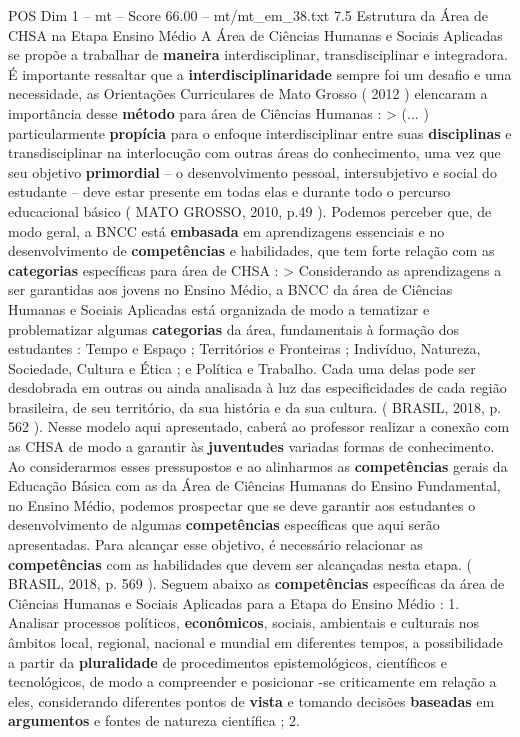 \begin{textsample}{POS Dim 1 – mt – Score 66.00 – mt/mt\_em\_38.txt}  \label{ex:f1_pos_075}
7.5 Estrutura da Área de CHSA na Etapa Ensino Médio A Área de Ciências Humanas e Sociais Aplicadas se propõe a trabalhar de \textbf{maneira} interdisciplinar, transdisciplinar e integradora.
É importante ressaltar que a \textbf{interdisciplinaridade} sempre foi um desafio e uma necessidade, as Orientações Curriculares de Mato Grosso ( 2012 ) elencaram a importância desse \textbf{método} para área de Ciências Humanas : > (... ) particularmente \textbf{propícia} para o enfoque interdisciplinar entre suas \textbf{disciplinas} e transdisciplinar na interlocução com outras áreas do conhecimento, uma vez que seu objetivo \textbf{primordial} – o desenvolvimento pessoal, intersubjetivo e social do estudante – deve estar presente em todas elas e durante todo o percurso educacional básico ( MATO GROSSO, 2010, p.49 ).
Podemos perceber que, de modo geral, a BNCC está \textbf{embasada} em aprendizagens essenciais e no desenvolvimento de \textbf{competências} e habilidades, que tem forte relação com as \textbf{categorias} específicas para área de CHSA : > Considerando as aprendizagens a ser garantidas aos jovens no Ensino Médio, a BNCC da área de Ciências Humanas e Sociais Aplicadas está organizada de modo a tematizar e problematizar algumas \textbf{categorias} da área, fundamentais à formação dos estudantes : Tempo e Espaço ; Territórios e Fronteiras ; Indivíduo, Natureza, Sociedade, Cultura e Ética ; e Política e Trabalho.
Cada uma delas pode ser desdobrada em outras ou ainda analisada à luz das especificidades de cada região brasileira, de seu território, da sua história e da sua cultura. ( BRASIL, 2018, p. 562 ).
Nesse modelo aqui apresentado, caberá ao professor realizar a conexão com as CHSA de modo a garantir às \textbf{juventudes} variadas formas de conhecimento.
Ao considerarmos esses pressupostos e ao alinharmos as \textbf{competências} gerais da Educação Básica com as da Área de Ciências Humanas do Ensino Fundamental, no Ensino Médio, podemos prospectar que se deve garantir aos estudantes o desenvolvimento de algumas \textbf{competências} específicas que aqui serão apresentadas.
Para alcançar esse objetivo, é necessário relacionar as \textbf{competências} com as habilidades que devem ser alcançadas nesta etapa. ( BRASIL, 2018, p. 569 ).
Seguem abaixo as \textbf{competências} específicas da área de Ciências Humanas e Sociais Aplicadas para a Etapa do Ensino Médio : 1.
Analisar processos políticos, \textbf{econômicos}, sociais, ambientais e culturais nos âmbitos local, regional, nacional e mundial em diferentes tempos, a possibilidade a partir da \textbf{pluralidade} de procedimentos epistemológicos, científicos e tecnológicos, de modo a compreender e posicionar -se criticamente em relação a eles, considerando diferentes pontos de \textbf{vista} e tomando decisões \textbf{baseadas} em \textbf{argumentos} e fontes de natureza científica ; 2.

\end{textsample}
